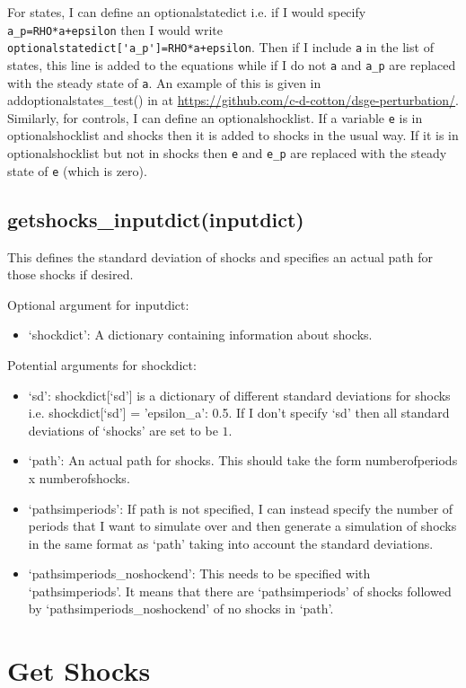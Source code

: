 \documentclass{article}
\theoremstyle{definition}
\begin{document}
For states, I can define an optionalstatedict i.e. if I would specify \verb|a_p=RHO*a+epsilon| then I would write \verb|optionalstatedict['a_p']=RHO*a+epsilon|. Then if I include \verb|a| in the list of states, this line is added to the equations while if I do not \verb|a| and \verb|a_p| are replaced with the steady state of \verb|a|. An example of this is given in addoptionalstates\_test() in  at \url{https://github.com/c-d-cotton/dsge-perturbation/}. Similarly, for controls, I can define an optionalshocklist. If a variable \verb|e| is in optionalshocklist and shocks then it is added to shocks in the usual way. If it is in optionalshocklist but not in shocks then \verb|e| and \verb|e_p| are replaced with the steady state of \verb|e| (which is zero).

\subsection{getshocks\_inputdict(inputdict)}
This defines the standard deviation of shocks and specifies an actual path for those shocks if desired.

Optional argument for inputdict:
\begin{itemize}
    \item `shockdict': A dictionary containing information about shocks.
\end{itemize}

Potential arguments for shockdict:
\begin{itemize}
    \item `sd': shockdict[`sd'] is a dictionary of different standard deviations for shocks i.e. shockdict[`sd'] = {'epsilon\_a': 0.5}. If I don't specify `sd' then all standard deviations of `shocks' are set to be $1$.
    \item `path': An actual path for shocks. This should take the form numberofperiods x numberofshocks.
    \item `pathsimperiods': If path is not specified, I can instead specify the number of periods that I want to simulate over and then generate a simulation of shocks in the same format as `path' taking into account the standard deviations.
    \item `pathsimperiods\_noshockend': This needs to be specified with `pathsimperiods'. It means that there are `pathsimperiods' of shocks followed by `pathsimperiods\_noshockend' of no shocks in `path'.
\end{itemize}

\section{Get Shocks}
\end{document}
